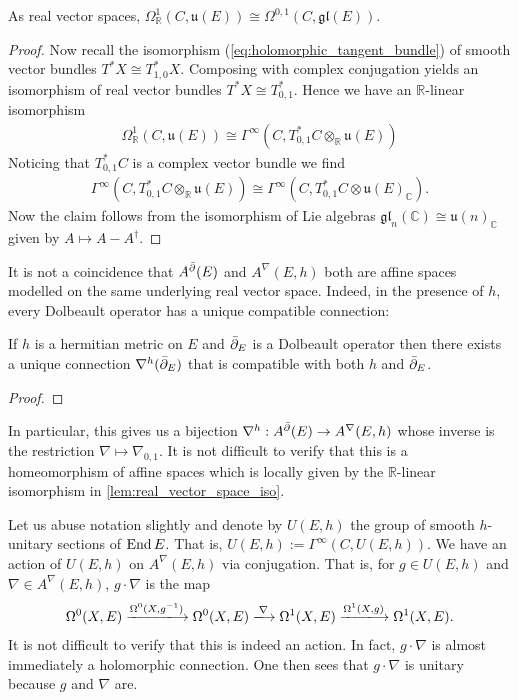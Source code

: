 \documentclass[12pt]{ociamthesis}  %
\begin{document}
\begin{lemma}\label{lem:real_vector_space_iso}
  As real vector spaces,
  $\Omega^1_{\mathbb{R}}(C,\mathfrak u(E))\cong\Omega^{0,1}(C,\mathfrak{gl}(E))$.
  \begin{proof}
    Now recall the isomorphism (\ref{eq:holomorphic_tangent_bundle}) of
    smooth vector bundles $T^* X \cong T^*_{1,0} X$. Composing with
    complex conjugation yields an isomorphism of real vector bundles
    $T^*X \cong T^*_{0,1}$. Hence we have an $\mathbb{R}$-linear
    isomorphism
    \begin{align*}
      \Omega^1_{\mathbb{R}}(C,\mathfrak u(E))
      \cong \Gamma^\infty(C,T^*_{0,1}C \otimes_{\mathbb{R}}\mathfrak u(E))
    \end{align*}
    Noticing that $T_{0,1}^* C$ is a complex vector bundle
    we find
    \begin{align*}
      \Gamma^\infty(C,T^*_{0,1}C \otimes_{\mathbb{R}}\mathfrak u(E))
      \cong\Gamma^\infty(C,T^*_{0,1}C \otimes\mathfrak u(E)_{\mathbb{C}}).
    \end{align*}
    Now the claim follows from the isomorphism of Lie algebras
    $\mathfrak{gl}_n(\mathbb{C})\cong\mathfrak u(n)_{\mathbb{C}}$
    given by $A \mapsto A-A^\dagger$.
  \end{proof}
\end{lemma}

It is not a coincidence that $A^{\bar{\partial}} (E)$ and $A^\nabla(E,h)$ both are
affine spaces modelled on the same underlying real vector space.
Indeed, in the presence of $h$, every Dolbeault operator has a unique
compatible connection:

\begin{theorem}\label{thm:chern_connection}
  If $h$ is a hermitian metric on $E$ and $\bar{\partial}_E$ is a Dolbeault
  operator then there exists a unique connection $\nabla^h(\bar{\partial}_E)$
  that is compatible with both $h$ and $\bar{\partial}_E$.
  \begin{proof}
    \missingproof
  \end{proof}
\end{theorem}

In particular, this gives us a bijection
$\nabla^h : A^{\bar{\partial}} (E) \to A^\nabla(E,h)$ whose inverse is the restriction
$\nabla \mapsto \nabla_{0,1}$. It is not difficult to verify that this
is a homeomorphism of affine spaces which is locally given by
the $\mathbb{R}$-linear isomorphism in \ref{lem:real_vector_space_iso}.

Let us abuse notation slightly and denote by $U(E,h)$ the group of smooth
$h$-unitary sections of $\operatorname{End} E$. That is, $U(E,h) := \Gamma^\infty(C,U(E,h))$.
We have an action of $U(E,h)$ on $A^\nabla(E,h)$ via conjugation. That is,
for $g\in U(E,h)$ and $\nabla\in A^\nabla(E,h)$, $g\cdot\nabla$ is the map
\begin{align*}
  \Omega^0(X,E) \xlongrightarrow{\Omega^0(X,{g}^{-1})}
  \Omega^0(X,E) \xlongrightarrow{\nabla}
  \Omega^1(X,E) \xlongrightarrow{\Omega^1(X,g)}
  \Omega^1(X,E).
\end{align*}
It is not difficult to verify that this is indeed an action.
In fact, $g\cdot\nabla$ is almost immediately a holomorphic connection.
One then sees that $g\cdot\nabla$ is unitary because
$g$ and $\nabla$ are.
\end{document}
